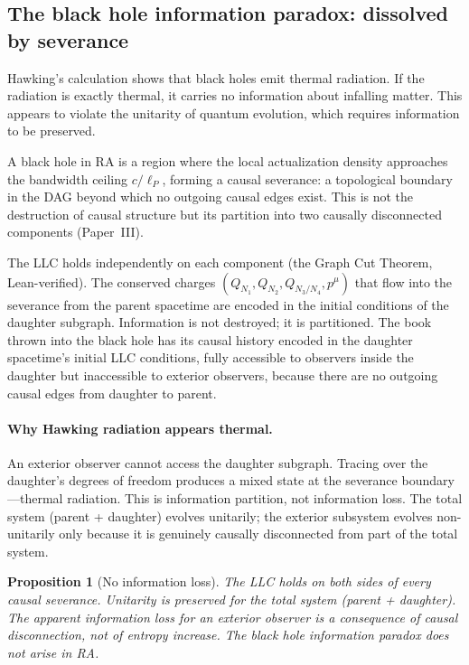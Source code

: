 \documentclass[11pt]{article}
\newtheorem{proposition}{Proposition}
\begin{document}
\subsection{The black hole information paradox: dissolved by severance}

Hawking's calculation shows that black holes emit thermal radiation. If the radiation is exactly thermal, it carries no information about infalling matter. This appears to violate the unitarity of quantum evolution, which requires information to be preserved.

A black hole in RA is a region where the local actualization density approaches the bandwidth ceiling $c/\ell_P$, forming a causal severance: a topological boundary in the DAG beyond which no outgoing causal edges exist. This is not the destruction of causal structure but its partition into two causally disconnected components (Paper~III).

The LLC holds independently on each component (the Graph Cut Theorem, Lean-verified). The conserved charges $(Q_{N_1},Q_{N_2},Q_{N_3/N_4},p^\mu)$ that flow into the severance from the parent spacetime are encoded in the initial conditions of the daughter subgraph. Information is not destroyed; it is partitioned. The book thrown into the black hole has its causal history encoded in the daughter spacetime's initial LLC conditions, fully accessible to observers inside the daughter but inaccessible to exterior observers, because there are no outgoing causal edges from daughter to parent.

\paragraph{Why Hawking radiation appears thermal.} An exterior observer cannot access the daughter subgraph. Tracing over the daughter's degrees of freedom produces a mixed state at the severance boundary---thermal radiation. This is information partition, not information loss. The total system (parent + daughter) evolves unitarily; the exterior subsystem evolves non-unitarily only because it is genuinely causally disconnected from part of the total system.

\begin{proposition}[No information loss]
The LLC holds on both sides of every causal severance. Unitarity is preserved for the total system (parent + daughter). The apparent information loss for an exterior observer is a consequence of causal disconnection, not of entropy increase. The black hole information paradox does not arise in RA.
\end{proposition}
\end{document}
